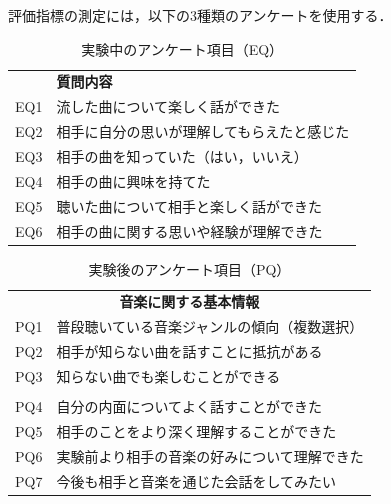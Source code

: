 評価指標の測定には，以下の3種類のアンケートを使用する．

\begin{table}[H]
  \caption{実験中のアンケート項目（EQ）}
  \label{実験中のアンケート項目}
  \centering
  \begin{tabular}{|l|p{}|}
    \hline
     & \textbf{質問内容} \\
    \hhline{|=|=|}
    EQ1 & 流した曲について楽しく話ができた \\
    \hline
    EQ2 & 相手に自分の思いが理解してもらえたと感じた \\
    \hline
    EQ3 & 相手の曲を知っていた（はい，いいえ） \\
    \hline
    EQ4 & 相手の曲に興味を持てた \\
    \hline
    EQ5 & 聴いた曲について相手と楽しく話ができた \\
    \hline
    EQ6 & 相手の曲に関する思いや経験が理解できた \\
    \hline
  \end{tabular}
\end{table}

\begin{table}[H]
  \caption{実験後のアンケート項目（PQ）}
  \label{実験後のアンケート項目}
  \centering
  \begin{tabular}{|l|p{}|}
    \hline
    \multicolumn{2}{|c|}{\textbf{音楽に関する基本情報}} \\
    \hhline{|=|=|}
    PQ1 & 普段聴いている音楽ジャンルの傾向（複数選択） \\
    \hline
    PQ2 & 相手が知らない曲を話すことに抵抗がある \\
    \hline
    PQ3 & 知らない曲でも楽しむことができる \\
    \hhline{|=|=|}
    \multicolumn{2}{|c|}{\textbf{自己開示と受容について}} \\
    \hhline{|=|=|}
    PQ4 & 自分の内面についてよく話すことができた \\
    \hline
    PQ5 & 相手のことをより深く理解することができた \\
    \hline
    PQ6 & 実験前より相手の音楽の好みについて理解できた \\
    \hline
    PQ7 & 今後も相手と音楽を通じた会話をしてみたい \\
    \hline
  \end{tabular}
\end{table}

